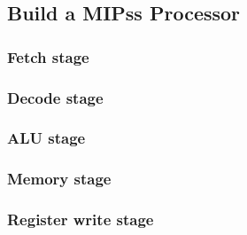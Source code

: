 \documentclass[12pt]{article}
\theoremstyle{definition}
\begin{document}
\subsection{Build a MIPss Processor}
\subsubsection{Fetch stage}
\subsubsection{Decode stage}
\subsubsection{ALU stage}
\subsubsection{Memory stage}
\subsubsection{Register write stage}
\end{document}
